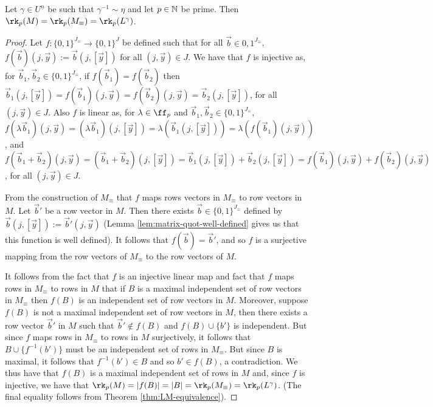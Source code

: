 \documentclass[../paper.tex]{subfiles}
\begin{document}
\begin{lem}
  Let $\gamma \in U^{\underline{n}}$ be such that $\gamma^{-1} \sim \eta$ and
  let $p \in \mathbb{N}$ be prime. Then $\rk_p (M) = \rk_p (M_\equiv) = \rk_p
  (L^{\gamma})$.
\end{lem}
\begin{proof}
  Let $f : \{0,1\}^{J_\equiv} \rightarrow \{0,1\}^{J}$ be defined such that for
  all $\vec{b} \in {0,1}^{J_\equiv}$, $f(\vec{b}) (j, \vec{y}) := \vec{b}(j,
  [\vec{y}])$ for all $(j, \vec{y}) \in J$. We have that $f$ is injective as,
  for $\vec{b}_1, \vec{b}_2 \in \{0,1\}^{J_\equiv}$, if $f(\vec{b}_1) =
  f(\vec{b}_2)$ then $\vec{b}_1 (j, [\vec{y}]) = f(\vec{b}_1)(j, \vec{y}) =
  f(\vec{b}_2)(j, \vec{y}) = \vec{b}_2(j, [\vec{y}])$, for all $(j, \vec{y}) \in
  J$. Also $f$ is linear as, for $\lambda \in \ff_p$ and $\vec{b}_1, \vec{b}_2
  \in \{0,1\}^{J_\equiv}$, $f(\lambda \vec{b}_1) (j, \vec{y}) = (\lambda
  \vec{b}_1)(j, [\vec{y}]) = \lambda (\vec{b}_1 (j, [\vec{y}])) = \lambda (f(
  \vec{b}_1) (j, \vec{y}))$, and $ f(\vec{b}_1 + \vec{b}_2) (j, \vec{y}) =
  (\vec{b}_1 + \vec{b}_2) (j, [\vec{y}]) = \vec{b}_1(j, [\vec{y}]) +
  \vec{b}_2(j, [\vec{y}]) = f(\vec{b}_1)(j, \vec{y}) + f(\vec{b}_2)(j,
  \vec{y})$, for all $(j, \vec{y}) \in J$.

  From the construction of $M_\equiv$ that $f$ maps rows vectors in $M_\equiv$
  to row vectors in $M$. Let $\vec{b}'$ be a row vector in $M$. Then there
  exists $\vec{b} \in \{0,1\}^{J_\equiv}$ defined by $\vec{b} (j, [\vec{y}]) :=
  \vec{b}' (j, \vec{y})$ (Lemma \ref{lem:matrix-quot-well-defined} gives us that
  this function is well defined). It follows that $f(\vec{b}) = \vec{b}'$, and
  so $f$ is a surjective mapping from the row vectors of $M_\equiv$ to the row
  vectors of $M$.

  It follows from the fact that $f$ is an injective linear map and fact that $f$
  maps rows in $M_\equiv$ to rows in $M$ that if $B$ is a maximal independent
  set of row vectors in $M_\equiv$ then $f(B)$ is an independent set of row
  vectors in $M$. Moreover, suppose $f(B)$ is not a maximal independent set of
  row vectors in $M$, then there exists a row vector $\vec{b}'$ in $M$ such that
  $\vec{b}' \notin f(B)$ and $f(B) \cup \{b'\}$ is independent. But since $f$
  maps rows in $M_\equiv$ to rows in $M$ surjectively, it follows that $B \cup
  \{f^{-1}(b') \}$ must be an independent set of rows in $M_\equiv$. But since
  $B$ is maximal, it follows that $f^{-1}(b') \in B$ and so $b' \in f(B)$, a
  contradiction. We thus have that $f(B)$ is a maximal independent set of rows
  in $M$ and, since $f$ is injective, we have that $\rk_p (M) = \vert f(B) \vert
  = \vert B \vert = \rk_p (M_\equiv) = \rk_p(L^{\gamma})$. (The final equality
  follows from Theorem \ref{thm:LM-equivalence}).
\end{proof}
\end{document}
